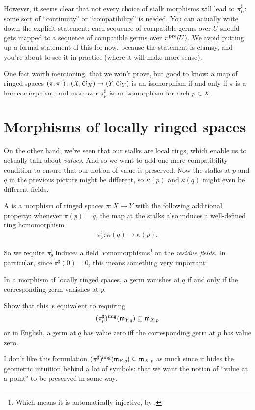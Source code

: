 However, it seems clear that not every choice of
stalk morphisms will lead to $\pi^\sharp_U$:
some sort of ``continuity'' or ``compatibility'' is needed.
You can actually write down the explicit statement:
each sequence of compatible germs over $U$
should gets mapped to a sequence of compatible germs over $\pi^{\text{pre}}(U)$.
We avoid putting up a formal statement of this for now,
because the statement is clumsy,
and you're about to see it in practice (where it will make more sense).

\begin{remark}
	One fact worth mentioning, that we won't prove, but good to know:
	a map of ringed spaces
	$(\pi, \pi^\sharp) \colon (X, \mathcal O_X) \to (Y, \mathcal O_Y)$
	is an isomorphism if and only if $\pi$ is a homeomorphism,
	and moreover $\pi^\sharp_p$ is an isomorphism for each $p \in X$.
\end{remark}

\section{Morphisms of locally ringed spaces}
On the other hand, we've seen that our stalks are local rings,
which enable us to actually talk about \emph{values}.
And so we want to add one more compatibility condition
to ensure that our notion of value is preserved.
Now the stalks at $p$ and $q$ in the previous picture might be different,
so $\kappa(p)$ and $\kappa(q)$ might even be different fields.
\begin{definition}
	A 
	is a morphism of ringed spaces $\pi \colon X \to Y$
	with the following additional property:
	whenever $\pi(p) = q$,
	the map at the stalks also induces a well-defined ring homomorphism
	\[ \pi^\sharp_p \colon \kappa(q) \to \kappa(p). \]
\end{definition}
So we require $\pi^\sharp_p$ induces a field homomorphisms\footnote{Which
means it is automatically injective, by .}
on the \emph{residue fields}.
In particular, since $\pi^\sharp(0) = 0$,
this means something very important:
\begin{moral}
	In a morphism of locally ringed spaces,
	a germ vanishes at $q$ if and only if
	the corresponding germ vanishes at $p$.
\end{moral}
\begin{exercise}
	Show that this is equivalent to requiring
	\[ (\pi^\sharp_p)^{\text{img}}(\mathfrak m_{Y,q}) \subseteq \mathfrak m_{X,p} \]
	or in English, a germ at $q$ has value zero
	iff the corresponding germ at $p$ has value zero.
\end{exercise}
I don't like this formulation
$(\pi^\sharp)^{\text{img}}(\mathfrak m_{Y,q}) \subseteq \mathfrak m_{X,p}$
as much since it hides the geometric intuition behind a lot of symbols:
that we want the notion of ``value at a point''
to be preserved in some way.

